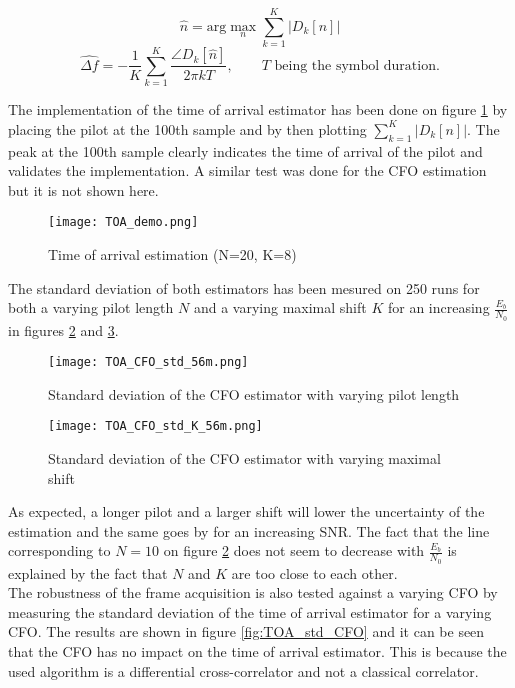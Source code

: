 \begin{equation*}
    \hat{n} = \text{arg} \max_n \sum_{k=1}^{K} |D_k[n]|
\end{equation*}
\begin{equation*}
    \hat{\Delta f} = -\frac{1}{K} \sum_{k=1}^{K} \frac{\angle D_k[\hat{n}]}{2\pi kT}, \qquad T \text{ being the symbol duration.}
\end{equation*}

The implementation of the time of arrival estimator has been done on figure \ref{fig:TOA_demo} by placing the pilot at the 100th sample and by then plotting $\sum_{k=1}^{K} |D_k[n]|$. The peak at the 100th sample clearly indicates the time of arrival of the pilot and validates the implementation. A similar test was done for the CFO estimation but it is not shown here. \\

\begin{figure}[H]
    \centering
    \texttt{[image: TOA\_demo.png]}
    \caption{Time of arrival estimation (N=20, K=8)}
    \label{fig:TOA_demo}
\end{figure}

The standard deviation of both estimators has been mesured on 250 runs for both a varying pilot length $N$ and a varying maximal shift $K$ for an increasing $\frac{E_b}{N_0}$ in figures \ref{fig:TOA_CFO_std_N} and \ref{fig:TOA_CFO_std_K}. 

\begin{figure}[H]
    \centering
    \texttt{[image: TOA\_CFO\_std\_56m.png]}
    \caption{Standard deviation of the CFO estimator with varying pilot length}
    \label{fig:TOA_CFO_std_N}
\end{figure}

\begin{figure}[H]
    \centering
    \texttt{[image: TOA\_CFO\_std\_K\_56m.png]}
    \caption{Standard deviation of the CFO estimator with varying maximal shift}
    \label{fig:TOA_CFO_std_K}
\end{figure}

As expected, a longer pilot and a larger shift will lower the uncertainty of the estimation and the same goes by for an increasing SNR. The fact that the line corresponding to $N = 10$ on figure \ref{fig:TOA_CFO_std_N} does not seem to decrease with $\frac{E_b}{N_0}$ is explained by the fact that $N$ and $K$ are too close to each other.\\
The robustness of the frame acquisition is also tested against a varying CFO by measuring the standard deviation of the time of arrival estimator for a varying CFO. The results are shown in figure \ref{fig:TOA_std_CFO} and it can be seen that the CFO has no impact on the time of arrival estimator. This is because the used algorithm is a differential cross-correlator and not a classical correlator. \\

